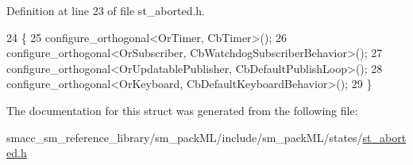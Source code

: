 Definition at line 23 of file st\+\_\+aborted.\+h.


\begin{DoxyCode}
24     \{
25         configure\_orthogonal<OrTimer, CbTimer>();   
26         configure\_orthogonal<OrSubscriber, CbWatchdogSubscriberBehavior>();
27         configure\_orthogonal<OrUpdatablePublisher, CbDefaultPublishLoop>();
28         configure\_orthogonal<OrKeyboard, CbDefaultKeyboardBehavior>();
29     \}
\end{DoxyCode}


The documentation for this struct was generated from the following file\+:\begin{DoxyCompactItemize}
\item 
smacc\+\_\+sm\+\_\+reference\+\_\+library/sm\+\_\+pack\+M\+L/include/sm\+\_\+pack\+M\+L/states/\hyperlink{st__aborted_8h}{st\+\_\+aborted.\+h}\end{DoxyCompactItemize}
